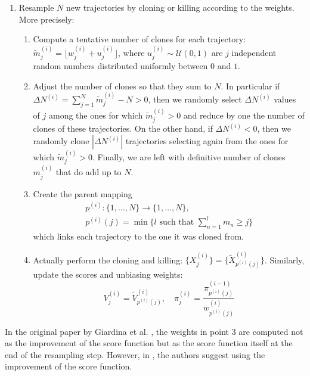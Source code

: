 \begin{enumerate}
    \item Resample $N$ new trajectories by cloning or killing according to the weights. More precisely:
        \begin{enumerate}
            \item Compute a tentative number of clones for each trajectory: $\tilde{m}_j^{(i)} = \lfloor w_j^{(i)} + u_j^{(i)} \rfloor$, where $u_j^{(i)} \sim \mathcal{U}(0, 1)$ are $j$ independent random numbers distributed uniformly between $0$ and $1$.
            \item Adjust the number of clones so that they sum to $N$. In particular if $\Delta N^{(i)} = \sum_{j=1}^N \tilde{m}_j^{(i)} - N > 0$, then we randomly select $\Delta N^{(i)}$ values of $j$ among the ones for which $\tilde{m}_j^{(i)} > 0$ and reduce by one the number of clones of these trajectories. On the other hand, if $\Delta N^{(i)} < 0$, then we randomly clone $| \Delta N^{(i)} |$ trajectories selecting again from the ones for which $\tilde{m}_j^{(i)} > 0$. Finally, we are left with definitive number of clones $m_j^{(i)}$ that do add up to $N$.
            \item Create the parent mapping
            \begin{gather*}
                p^{(i)} : \{1, \ldots, N\} \rightarrow \{1, \ldots, N\}, \\ p^{(i)}(j) = \min \{l \text{ such that } \sum_{n=1}^l m_n \geq j\}
            \end{gather*}
            which links each trajectory to the one it was cloned from.
            \item Actually perform the cloning and killing: $\{X^{(i)}_j\} = \{\tilde{X}^{(i)}_{p^{(i)}(j)}\} $.
            Similarly, update the scores and unbiasing weights:
            $$V_j^{(i)} = \tilde{V}^{(i)}_{p^{(i)}(j)}, \quad \pi_j^{(i)} = \frac{\pi_{p^{(i)}(j)}^{(i-1)}}{w^{(i)}_{p^{(i)}(j)}}$$
        \end{enumerate}
\end{enumerate}

In the original paper by Giardina et al. \cite{GIA11}, the weights in point 3 are computed not as the improvement of the score function but as the score function itself at the end of the resampling step. However, in \cite{GAR06}, the authors suggest using the improvement of the score function.


